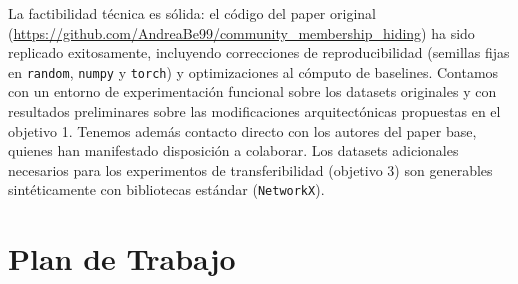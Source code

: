\documentclass[11pt,a4paper]{article}
\begin{document}
La factibilidad técnica es sólida: el código del paper original (\url{https://github.com/AndreaBe99/community_membership_hiding}) ha sido replicado exitosamente, incluyendo correcciones de reproducibilidad (semillas fijas en \texttt{random}, \texttt{numpy} y \texttt{torch}) y optimizaciones al cómputo de baselines.
Contamos con un entorno de experimentación funcional sobre los datasets originales y con resultados preliminares sobre las modificaciones arquitectónicas propuestas en el objetivo 1.
Tenemos además contacto directo con los autores del paper base, quienes han manifestado disposición a colaborar.
Los datasets adicionales necesarios para los experimentos de transferibilidad (objetivo 3) son generables sintéticamente con bibliotecas estándar (\texttt{NetworkX}).

\section*{Plan de Trabajo}
\end{document}
